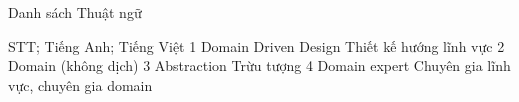 
Danh sách Thuật ngữ

STT; Tiếng Anh; Tiếng Việt
1 Domain Driven Design Thiết kế hướng lĩnh vực
2 Domain (không dịch)
3 Abstraction Trừu tượng
4 Domain expert Chuyên gia lĩnh vực, chuyên gia domain
